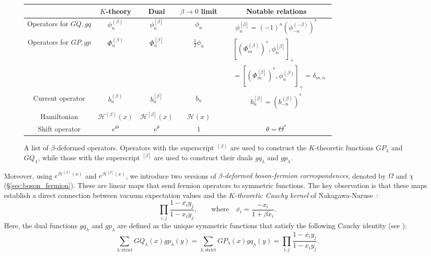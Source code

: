 \documentclass{amsart}
\begin{document}
\begin{figure}[htbp]
\centering
\begin{tabular}{c|c|c|c|c}
&
$K$-theory
& Dual
 & $\beta\to 0$ limit & 
Notable relations \\\hline\hline
%
%
Operators for $GQ,gq$
&
$\phi^{(\beta)}_n$ & $\phi^{[\beta]}_n$& $\phi_n$ & 
$\phi^{[\beta]}_n=(-1)^n(\phi^{(-\beta)}_{-n})^\ast$
\\\hline
%
%
Operators for $GP,gp$
&
$\Phi^{(\beta)}_n$ & $\Phi^{[\beta]}_n$ & $\frac{1}{2}\phi_n$
& 
$
\begin{aligned}
&[(\Phi_m^{(\beta)})^\ast,\phi_n^{[\beta]}]_+\\[-.1em]
&=[(\Phi_m^{[\beta]})^\ast,\phi_n^{(\beta)}]_+=\delta_{m,n}
\end{aligned}
$\\\hline
%
%
Current operator
&
$b_n^{(\beta)}$ & $b^{[\beta]}_n$ & $b_n$ & 
$b_n^{[\beta]}=(b^{(\beta)}_{-n})^\ast$
\\\hline
%
%
Hamiltonian
&
$\mathcal{H}^{(\beta)}(x)$ & $\mathcal{H}^{[\beta]}(x)$ &
$\mathcal{H}(x)$ & 
\\\hline
%
%
Shift operator
&
$e^{\Theta}$ & $e^\theta$ & $1$ & $\theta=\Theta^\ast$
\end{tabular}


\caption{A list of $\beta$-deformed operators.
Operators with the superscript ${}^{(\beta)}$ are used to construct the $K$-theoretic functions $GP_\lambda$ and $GQ_\lambda$,  
while those with the superscript ${}^{[\beta]}$ are used to construct their duals $gq_\lambda$ and $gp_\lambda$.}
\label{fig:beta-objects}
\end{figure}

Moreover, using $e^{\mathcal{H}^{(\beta)}(x)}$ and $e^{\mathcal{H}^{[\beta]}(x)}$, we introduce two versions of \textit{$\beta$-deformed boson-fermion correspondences}, denoted by $\Omega$ and $\chi$ (\S \ref{sec:boson_fermion}).
These are linear maps that send fermion operators to symmetric functions.
The key observation is that these maps establish a direct connection between vacuum expectation values and the \textit{$K$-theoretic Cauchy kernel} of Nakagawa-Naruse~\cite[Definition 5.3]{nakagawa2016generalized}:
\[
\prod_{i,j}
\frac{1-\overline{x_i}y_j}{1-x_iy_j},\qquad\mbox{where}\quad
\overline{x_i}=\frac{-x_i}{1+\beta x_i}.
\]
Here, the dual functions $gq_\lambda$ and $gp_\lambda$ are defined as the unique symmetric functions that satisfy the following Cauchy identity (see \cite[Definition 1.2]{lewis2024combinatorial}):
\begin{equation}\label{eq:Cauchy_identity}
\sum_{\lambda:\mathrm{strict}}GQ_\lambda(x)gp_\lambda(y)
=
\sum_{\lambda:\mathrm{strict}}GP_\lambda(x)gq_\lambda(y)
=
\prod_{i,j}
\frac{1-\overline{x_i}y_j}{1-x_iy_j}.
\end{equation}
\end{document}
